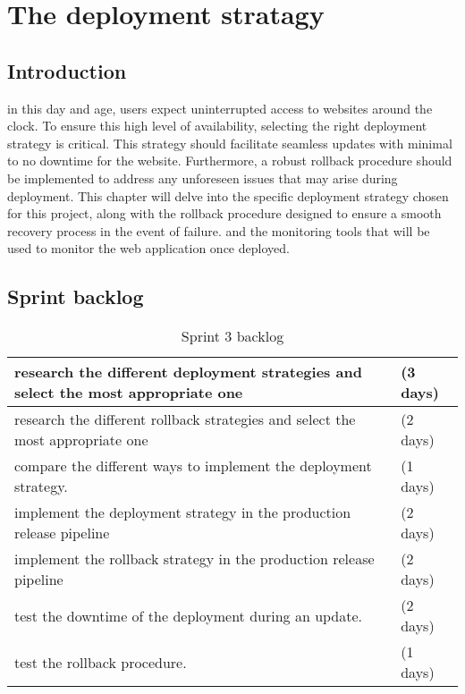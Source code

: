 \chapter{The deployment stratagy}
\section{Introduction}
in this day and age, users expect uninterrupted access to websites around the clock.  To ensure this high level of availability, selecting the right deployment strategy is critical.  This strategy should facilitate seamless updates with minimal to no downtime for the website.  Furthermore, a robust rollback procedure should be implemented to address any unforeseen issues that may arise during deployment.  This chapter will delve into the specific deployment strategy chosen for this project, along with the rollback procedure designed to ensure a smooth recovery process in the event of failure. and the monitoring tools that will be used to monitor the web application once deployed.
\section{Sprint backlog}
\begin{longtable}[c]{
    |p{}|
    p{}|
    }
    \caption{Sprint 3 backlog}
    \label{tab:Sprint3_backlog}                                                                   \\
    \hline
    research the different deployment strategies and select the most appropriate one & (3 days) \\
    \hline
    research the different rollback strategies and select the most appropriate one   & (2 days) \\
    \hline
    compare the different ways to implement the deployment strategy.                 & (1 days) \\
    \hline
    implement the deployment strategy in the production release pipeline             & (2 days) \\
    \hline
    implement the rollback strategy in the production release pipeline               & (2 days) \\
    \hline
    test the downtime of the deployment during an update.                            & (2 days) \\
    \hline
    test the rollback procedure.                                                     & (1 days) \\ 
    \hline
\end{longtable}
